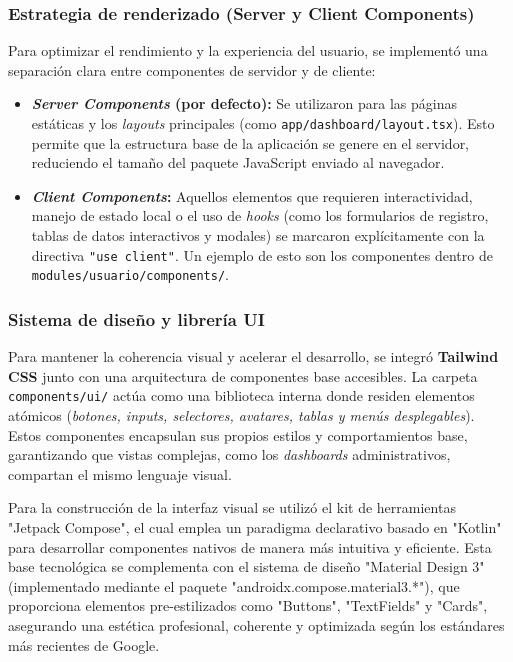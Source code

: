 \documentclass[12pt,letterpaper]{report}
\begin{document}
	\subsubsection{Estrategia de renderizado (Server y Client Components)}
	Para optimizar el rendimiento y la experiencia del usuario, se implementó una separación clara entre componentes de servidor y de cliente:
	\begin{itemize}
		\item \textbf{\textit{Server Com\-po\-nents} (por defecto):} Se utilizaron para las páginas estáticas y los \textit{lay\-outs} principales (como \texttt{app/dashboard/layout.tsx}). Esto permite que la estructura base de la aplicación se genere en el servidor, reduciendo el tamaño del paquete JavaScript enviado al navegador.
		\item \textbf{\textit{Client Com\-po\-nents}:} Aquellos elementos que requieren interactividad, manejo de estado local o el uso de \textit{hooks} (como los formularios de registro, tablas de datos interactivos y modales) se marcaron explícitamente con la directiva \texttt{"use client"}. Un ejemplo de esto son los componentes dentro de \texttt{modules/usuario/components/}.
	\end{itemize}
	
	\subsubsection{Sistema de diseño y librería UI}
	Para mantener la coherencia visual y acelerar el desarrollo, se integró \textbf{Tailwind CSS} junto con una arquitectura de componentes base accesibles. 
	La carpeta \texttt{components/ui/} actúa como una biblioteca interna donde residen elementos atómicos (\textit{botones, inputs, selectores, avatares, tablas y menús desplegables}). Estos componentes encapsulan sus propios estilos y comportamientos base, garantizando que vistas complejas, como los \textit{dash\-boards} administrativos, compartan el mismo lenguaje visual.
	
	Para la construcción de la interfaz visual se utilizó el kit de herramientas "Jetpack Compose", el cual emplea un paradigma declarativo basado en "Kotlin" para desarrollar componentes nativos de manera más intuitiva y eficiente. Esta base tecnológica se complementa con el sistema de diseño "Material Design 3" (implementado mediante el paquete "androidx.compose.material3.*"), que proporciona elementos pre-estilizados como "Buttons", "TextFields" y "Cards", asegurando una estética profesional, coherente y optimizada según los estándares más recientes de Google.
	
\end{document}
